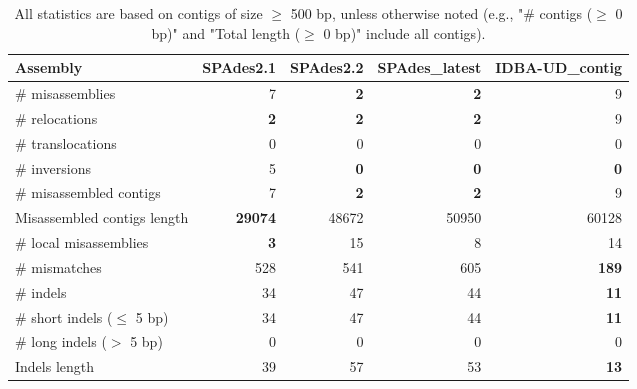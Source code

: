 \documentclass[12pt,a4paper]{article}
\begin{document}
\begin{table}[ht]
\begin{center}
\caption{All statistics are based on contigs of size $\geq$ 500 bp, unless otherwise noted (e.g., "\# contigs ($\geq$ 0 bp)" and "Total length ($\geq$ 0 bp)" include all contigs).}
\begin{tabular}{|l*{4}{|r}|}
\hline
Assembly & SPAdes2.1 & SPAdes2.2 & SPAdes\_latest & IDBA-UD\_contig \\ \hline
\# misassemblies & 7 & {\bf 2} & {\bf 2} & 9 \\ \hline
\hspace{5mm}\# relocations & {\bf 2} & {\bf 2} & {\bf 2} & 9 \\ \hline
\hspace{5mm}\# translocations & 0 & 0 & 0 & 0 \\ \hline
\hspace{5mm}\# inversions & 5 & {\bf 0} & {\bf 0} & {\bf 0} \\ \hline
\# misassembled contigs & 7 & {\bf 2} & {\bf 2} & 9 \\ \hline
Misassembled contigs length & {\bf 29074} & 48672 & 50950 & 60128 \\ \hline
\# local misassemblies & {\bf 3} & 15 & 8 & 14 \\ \hline
\# mismatches & 528 & 541 & 605 & {\bf 189} \\ \hline
\# indels & 34 & 47 & 44 & {\bf 11} \\ \hline
\hspace{5mm}\# short indels ($\leq$ 5 bp) & 34 & 47 & 44 & {\bf 11} \\ \hline
\hspace{5mm}\# long indels ($>$ 5 bp) & 0 & 0 & 0 & 0 \\ \hline
Indels length & 39 & 57 & 53 & {\bf 13} \\ \hline
\end{tabular}
\end{center}
\end{table}
\end{document}

